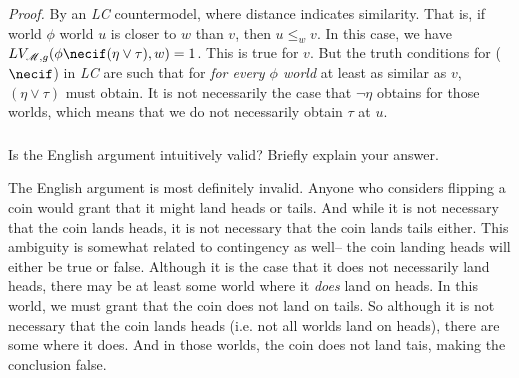 \documentclass{article}
\begin{document}
        \textit{Proof.} By an \textit{LC} countermodel, where distance indicates similarity. That is, if world $\phi$ world $u$ is closer to $w$ than $v$, then $u \leq_w v$.
        In this case, we have $LV_{\mathscr{M},g}(\phi \necif (\eta \vee \tau) , w) = 1$. This is true for $v$.
        But the truth conditions for ($\necif$) in \textit{LC} are such that for \textit{for every $\phi$ world} at least as similar as $v$, $(\eta \vee \tau)$ must obtain.
        It is not necessarily the case that $\lnot \eta$ obtains for those worlds, which means that we do not necessarily obtain $\tau$ at $u$.
        \begin{center}
        \end{center}
        

    \subsubsection{}
    \begin{task}
        Is the English argument intuitively valid? Briefly explain your answer.
    \end{task}

    The English argument is most definitely invalid. Anyone who considers flipping a coin would grant that it might land heads or tails.
    And while it is not necessary that the coin lands heads, it is not necessary that the coin lands tails either. 
    This ambiguity is somewhat related to contingency as well-- the coin landing heads will either be true or false.
    Although it is the case that it does not necessarily land heads, there may be at least some world where it \textit{does} land on heads.
    In this world, we must grant that the coin does not land on tails. So although it is not necessary that the coin lands heads (i.e. not all worlds land on heads), there are some where it does.
    And in those worlds, the coin does not land tais, making the conclusion false.
\end{document}
